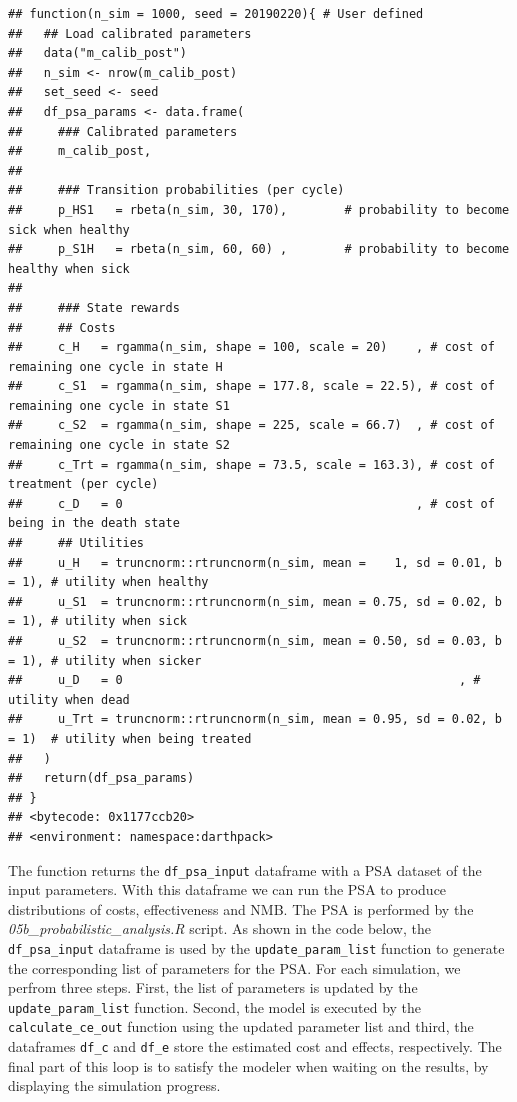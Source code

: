 \documentclass[]{book}
\begin{document}
\begin{verbatim}
## function(n_sim = 1000, seed = 20190220){ # User defined
##   ## Load calibrated parameters
##   data("m_calib_post")
##   n_sim <- nrow(m_calib_post)
##   set_seed <- seed
##   df_psa_params <- data.frame(
##     ### Calibrated parameters
##     m_calib_post,
##     
##     ### Transition probabilities (per cycle)
##     p_HS1   = rbeta(n_sim, 30, 170),        # probability to become sick when healthy
##     p_S1H   = rbeta(n_sim, 60, 60) ,        # probability to become healthy when sick
##     
##     ### State rewards
##     ## Costs
##     c_H   = rgamma(n_sim, shape = 100, scale = 20)    , # cost of remaining one cycle in state H
##     c_S1  = rgamma(n_sim, shape = 177.8, scale = 22.5), # cost of remaining one cycle in state S1
##     c_S2  = rgamma(n_sim, shape = 225, scale = 66.7)  , # cost of remaining one cycle in state S2
##     c_Trt = rgamma(n_sim, shape = 73.5, scale = 163.3), # cost of treatment (per cycle)
##     c_D   = 0                                         , # cost of being in the death state
##     ## Utilities
##     u_H   = truncnorm::rtruncnorm(n_sim, mean =    1, sd = 0.01, b = 1), # utility when healthy
##     u_S1  = truncnorm::rtruncnorm(n_sim, mean = 0.75, sd = 0.02, b = 1), # utility when sick
##     u_S2  = truncnorm::rtruncnorm(n_sim, mean = 0.50, sd = 0.03, b = 1), # utility when sicker
##     u_D   = 0                                               , # utility when dead
##     u_Trt = truncnorm::rtruncnorm(n_sim, mean = 0.95, sd = 0.02, b = 1)  # utility when being treated
##   )
##   return(df_psa_params)
## }
## <bytecode: 0x1177ccb20>
## <environment: namespace:darthpack>
\end{verbatim}

The function returns the \texttt{df\_psa\_input} dataframe with a PSA
dataset of the input parameters. With this dataframe we can run the PSA
to produce distributions of costs, effectiveness and NMB. The PSA is
performed by the \emph{05b\_probabilistic\_analysis.R} script. As shown
in the code below, the \texttt{df\_psa\_input} dataframe is used by the
\texttt{update\_param\_list} function to generate the corresponding list
of parameters for the PSA. For each simulation, we perfrom three steps.
First, the list of parameters is updated by the
\texttt{update\_param\_list} function. Second, the model is executed by
the \texttt{calculate\_ce\_out} function using the updated parameter
list and third, the dataframes \texttt{df\_c} and \texttt{df\_e} store
the estimated cost and effects, respectively. The final part of this
loop is to satisfy the modeler when waiting on the results, by
displaying the simulation progress.
\end{document}
